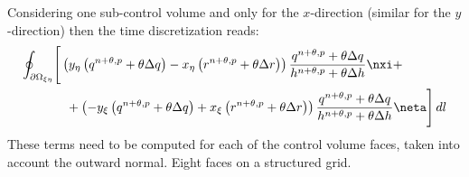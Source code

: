 Considering one sub-control volume and only for the $x$-direction (similar for the
$y$-direction) then the time discretization reads:
%
\begin{align}
    \oint_{\partial\Omega_{\xi\eta}} & \Bigg[\left( y_\eta\left(q^{n+\theta, p} + \theta \Delta q\right) - x_\eta \left( r^{n+\theta, p} + \theta \Delta r  \right) \right)
    \frac{q^{n+\theta, p} + \theta \Delta q}{h^{n+\theta, p} + \theta \Delta h} \nxi +
    \nonumber\\*
    &\quad  + \left(-y_\xi\left(q^{n+\theta, p} + \theta \Delta q\right) +
    x_\xi\left( r^{n+\theta, p} + \theta \Delta r \right) \right) \frac{q^{n+\theta, p} + \theta \Delta q}{h^{n+\theta, p} + \theta \Delta h} \neta
    \Bigg]\, dl
\end{align}
These terms need to be computed for each of the control volume faces, taken
into account the outward normal. Eight faces on a structured grid.

